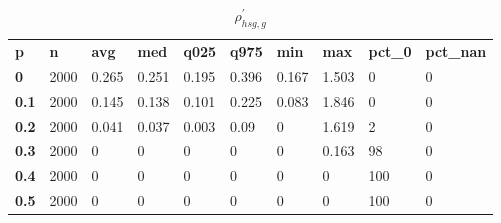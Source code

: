 \begin{table}[h]
 \centering 
\footnotesize
\caption{$\rho_{hsg,g}^\prime $}
\label{tab:alphahsgg}
\begin{tabular}[h]{| l l l l l l l l l l|
    } \hline
\textbf{ p} & \textbf{ n} & \textbf{ avg} & \textbf{ med} & \textbf{ q025} & \textbf{ q975} & \textbf{ min} & \textbf{ max} & \textbf{ pct\_0} & \textbf{ pct\_nan}
           \\
  \textbf{  0} & 2000 & 0.265 & 0.251 & 0.195 & 0.396 & 0.167 & 1.503 &   0 & 0
           \\
  \textbf{0.1} & 2000 & 0.145 & 0.138 & 0.101 & 0.225 & 0.083 & 1.846 &   0 & 0
           \\
  \textbf{0.2} & 2000 & 0.041 & 0.037 & 0.003 &  0.09 &     0 & 1.619 &   2 & 0
           \\
  \textbf{0.3} & 2000 &     0 &     0 &     0 &     0 &     0 & 0.163 &  98 & 0
           \\
  \textbf{0.4} & 2000 &     0 &     0 &     0 &     0 &     0 &     0 & 100 & 0
           \\
  \textbf{0.5} & 2000 &     0 &     0 &     0 &     0 &     0 &     0 & 100 & 0
           \\
 \hline \end{tabular}
 \end{table}
